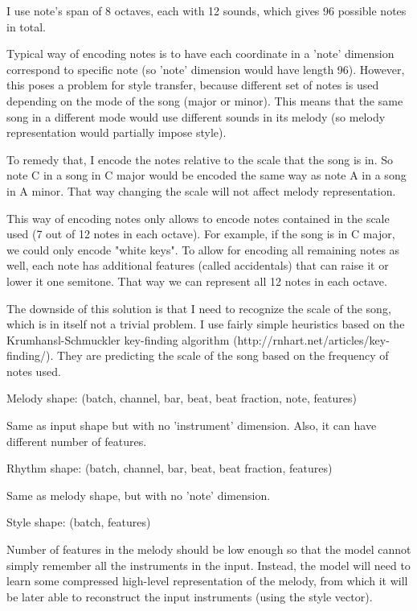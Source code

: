 \documentclass[en]{pracamgr}
\begin{document}
I use note's span of 8 octaves, each with 12 sounds, which gives 96 possible notes in total.

Typical way of encoding notes is to have each coordinate in a 'note' dimension correspond to specific note (so 'note' dimension would have length 96). However, this poses a problem for style transfer, because different set of notes is used depending on the mode of the song (major or minor). This means that the same song in a different mode would use different sounds in its melody (so melody representation would partially impose style).

To remedy that, I encode the notes relative to the scale that the song is in. So note C in a song in C major would be encoded the same way as note A in a song in A minor. That way changing the scale will not affect melody representation.

This way of encoding notes only allows to encode notes contained in the scale used (7 out of 12 notes in each octave). For example, if the song is in C major, we could only encode "white keys". To allow for encoding all remaining notes as well, each note has additional features (called accidentals) that can raise it or lower it one semitone. That way we can represent all 12 notes in each octave.

The downside of this solution is that I need to recognize the scale of the song, which is in itself not a trivial problem. I use fairly simple heuristics based on the Krumhansl-Schmuckler key-finding algorithm (http://rnhart.net/articles/key-finding/). They are predicting the scale of the song based on the frequency of notes used.

Melody shape: (batch, channel, bar, beat, beat fraction, note, features)

Same as input shape but with no 'instrument' dimension. Also, it can have different number of features.

Rhythm shape: (batch, channel, bar, beat, beat fraction, features)

Same as melody shape, but with no 'note' dimension.

Style shape: (batch, features)

Number of features in the melody should be low enough so that the model cannot simply remember all the instruments in the input. Instead, the model will need to learn some compressed high-level representation of the melody, from which it will be later able to reconstruct the input instruments (using the style vector).
\end{document}
